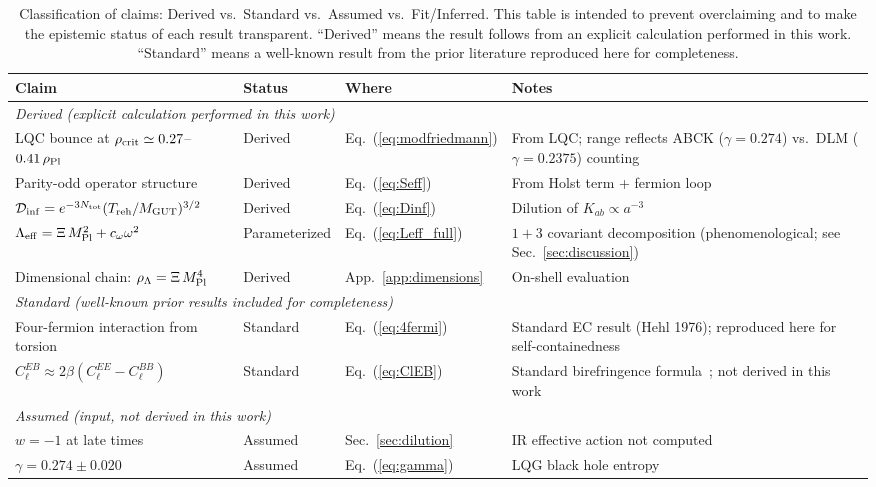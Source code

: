 \documentclass[aps,prd,twocolumn,superscriptaddress,showpacs,preprintnumbers,nofootinbib,longbibliography,floatfix]{revtex4-2}
\newcommand{\Leff}{\Lambda_{\rm eff}}
\newcommand{\Dinf}{\mathcal{D}_{\rm inf}}
\newcommand{\rhocrit}{\rho_{\rm crit}}
\newcommand{\rhoPl}{\rho_{\rm Pl}}
\newcommand{\MPl}{M_{\rm Pl}}
\begin{document}
\begin{table}[t]
\caption{\label{tab:claims} Classification of claims: Derived vs.\ Standard vs.\ Assumed vs.\ Fit/Inferred. This table is intended to prevent overclaiming and to make the epistemic status of each result transparent. ``Derived'' means the result follows from an explicit calculation performed in this work. ``Standard'' means a well-known result from the prior literature reproduced here for completeness.}
\begin{ruledtabular}
\begin{tabular}{llll}
\textbf{Claim} & \textbf{Status} & \textbf{Where} & \textbf{Notes} \\
\hline
\multicolumn{4}{l}{\textit{Derived (explicit calculation performed in this work)}} \\
LQC bounce at $\rhocrit \simeq 0.27$--$0.41\,\rhoPl$ & Derived & Eq.~(\ref{eq:modfriedmann}) & From LQC; range reflects ABCK ($\gamma=0.274$) vs.\ DLM ($\gamma=0.2375$) counting \\
Parity-odd operator structure & Derived & Eq.~(\ref{eq:Seff}) & From Holst term + fermion loop \\
$\Dinf = e^{-3N_{\rm tot}}(T_{\rm reh}/M_{\rm GUT})^{3/2}$ & Derived & Eq.~(\ref{eq:Dinf}) & Dilution of $K_{ab} \propto a^{-3}$ \\
$\Leff = \Xi\,\MPl^2 + c_\omega\omega^2$ & Parameterized & Eq.~(\ref{eq:Leff_full}) & $1+3$ covariant decomposition (phenomenological; see Sec.~\ref{sec:discussion}) \\
Dimensional chain: $\rho_\Lambda = \Xi\,\MPl^4$ & Derived & App.~\ref{app:dimensions} & On-shell evaluation \\
\hline
\multicolumn{4}{l}{\textit{Standard (well-known prior results included for completeness)}} \\
Four-fermion interaction from torsion & Standard & Eq.~(\ref{eq:4fermi}) & Standard EC result (Hehl 1976); reproduced here for self-containedness \\
$C_\ell^{EB} \approx 2\beta(C_\ell^{EE} - C_\ell^{BB})$ & Standard & Eq.~(\ref{eq:ClEB}) & Standard birefringence formula~\cite{Minami2020}; not derived in this work \\
\hline
\multicolumn{4}{l}{\textit{Assumed (input, not derived in this work)}} \\
$w = -1$ at late times & Assumed & Sec.~\ref{sec:dilution} & IR effective action not computed \\
$\gamma = 0.274 \pm 0.020$ & Assumed & Eq.~(\ref{eq:gamma}) & LQG black hole entropy \\

\end{tabular}
\end{ruledtabular}
\end{table}
\end{document}
